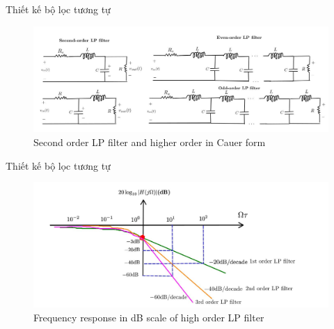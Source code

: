 \documentclass[8pt]{beamer}
\begin{document}
\begin{frame}{Thiết kế bộ lọc tương tự}
\begin{figure}[h]
			\includegraphics[width=1.1\textwidth]{4.jpg}
			\caption{Second order LP filter and higher order in Cauer form}			\label{fig:re2}
		\end{figure}

\end{frame}
\begin{frame}{Thiết kế bộ lọc tương tự}
\begin{figure}[h]
			\includegraphics[width=1.1\textwidth]{5.jpg}
			\caption{Frequency response in dB scale of high order LP filter}			\label{fig:re2}
		\end{figure}

\end{frame}
\end{document}
